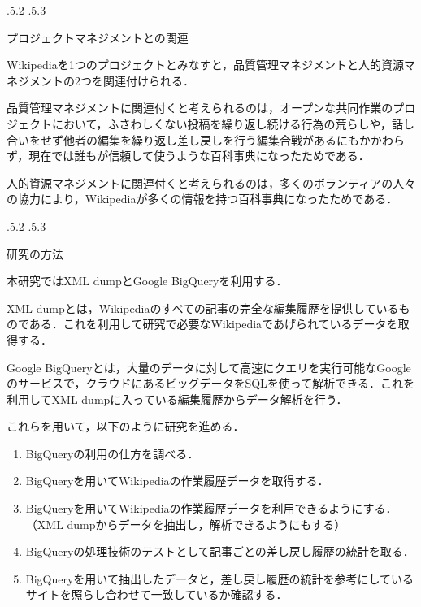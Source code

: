 \documentclass[uplatex]{jsarticle}
\makeatletter
\renewcommand{\section}{%
    \if@slide\clearpage\fi
    \@startsection{section}{1}{\z@}%
    {\Cvs \@plus.5\Cdp \@minus.2\Cdp}%
    {.5\Cvs \@plus.3\Cdp}%
    {\normalfont\raggedright}}
\makeatother
\begin{document}
\section{プロジェクトマネジメントとの関連}

Wikipediaを1つのプロジェクトとみなすと，品質管理マネジメントと人的資源マネジメントの2つを関連付けられる\cite{test8}．

品質管理マネジメントに関連付くと考えられるのは，オープンな共同作業のプロジェクトにおいて，ふさわしくない投稿を繰り返し続ける行為の荒らしや，話し合いをせず他者の編集を繰り返し差し戻しを行う編集合戦があるにもかかわらず，現在では誰もが信頼して使うような百科事典になったためである．

人的資源マネジメントに関連付くと考えられるのは，多くのボランティアの人々の協力により，Wikipediaが多くの情報を持つ百科事典になったためである．






\section{研究の方法}

本研究ではXML dump\cite{test105}とGoogle BigQuery\cite{test104}を利用する．

XML dumpとは，Wikipediaのすべての記事の完全な編集履歴を提供しているものである．これを利用して研究で必要なWikipediaであげられているデータを取得する．

Google BigQueryとは，大量のデータに対して高速にクエリを実行可能なGoogleのサービスで，クラウドにあるビッグデータをSQLを使って解析できる．これを利用してXML dumpに入っている編集履歴からデータ解析を行う．

これらを用いて，以下のように研究を進める．

\begin{enumerate}
\item BigQueryの利用の仕方を調べる\cite{test102}．

\item BigQueryを用いてWikipediaの作業履歴データを取得する．

\item BigQueryを用いてWikipediaの作業履歴データを利用できるようにする．（XML dumpからデータを抽出し，解析できるようにもする）

\item BigQueryの処理技術のテストとして記事ごとの差し戻し履歴の統計を取る．

\item BigQueryを用いて抽出したデータと，差し戻し履歴の統計を参考にしているサイト\cite{test103}を照らし合わせて一致しているか確認する．
\end{enumerate}
\end{document}
